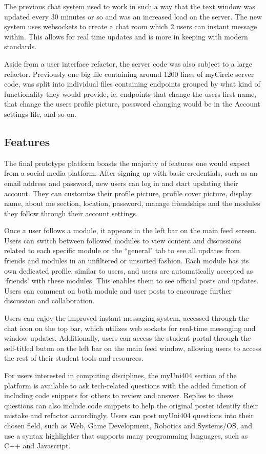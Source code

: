\documentclass[lettersize,journal]{IEEEtran}
\begin{document}
The previous chat system used to work in such a way that the text window was updated every 30 minutes or so and was an increased load on the server. The new system uses websockets to create a chat room which 2 users can instant message within. This allows for real time updates and is more in keeping with modern standards.

 Aside from a user interface refactor, the server code was also subject to a large refactor. Previously one big file containing around 1200 lines of myCircle \cite{myCircle} server code, was split into individual files containing endpoints grouped by what kind of functionality they would provide, ie. endpoints that change the users first name, that change the users profile picture, password changing would be in the Account settings file, and so on.

 \subsection{Features}

 The final prototype platform boasts the majority of features one would expect from a social media platform. After signing up with basic credentials, such as an email address and password,
 new users can log in and start updating their account. They can customize their profile picture, profile cover picture, display name, about me section, location, password, manage friendships
 and the modules they follow through their account settings.
 
 Once a user follows a module, it appears in the left bar on the main feed screen. Users can switch between followed modules to view content and discussions related to each specific module
 or the ``general" tab to see all updates from friends and modules in an unfiltered or unsorted fashion. Each module has its own dedicated profile, similar to users, and users are automatically
 accepted as `friends' with these modules. This enables them to see official posts and updates. Users can comment on both module and user posts to encourage further discussion and collaboration.

 Users can enjoy the improved instant messaging system, accessed through the chat icon on the top bar, which utilizes web sockets for real-time messaging and window updates. Additionally, users
 can access the student portal through the self-titled buton on the left bar on the main feed window, allowing users to access the rest of their student tools and resources.

 For users interested in computing disciplines, the myUni404 section of the platform is available to ask tech-related questions with the added function of including code snippets for others to 
 review and answer. Replies to these questions can also include code snippets to help the original poster identify their mistake and refactor accordingly. Users can post myUni404 questions into 
 their chosen field, such as Web, Game Development, Robotics and Systems/OS, and use a syntax highlighter that supports many programming languages, such as C++ and Javascript.
\end{document}
